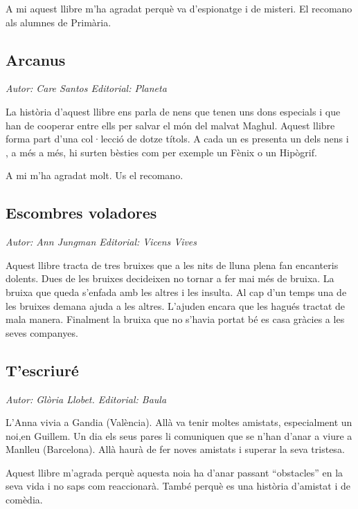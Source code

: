 \begin{news}
A mi aquest llibre m’ha agradat perquè va d’espionatge i de misteri. El recomano als alumnes de Primària.


\subsection*{Arcanus}
\emph{Autor: Care Santos   Editorial: Planeta}

La història d’aquest llibre ens parla de nens que tenen uns dons especials i que han de cooperar entre ells per salvar el món del malvat Maghul. Aquest llibre forma part d’una col·lecció de dotze títols. A cada un es presenta un dels nens i , a més a més, hi surten bèsties com per exemple un Fènix o un Hipògrif. 

A mi m’ha agradat molt. Us el recomano.


\subsection*{Escombres voladores}
\emph{Autor: Ann Jungman    Editorial: Vicens Vives}

Aquest llibre tracta de tres bruixes que a les nits de lluna plena fan encanteris dolents. Dues de les bruixes decideixen no tornar a fer mai més de bruixa. La bruixa que queda s’enfada amb les altres i les insulta. Al cap d’un temps una de les bruixes demana ajuda a les altres. L’ajuden encara que les hagués tractat de mala manera. Finalment la bruixa que no s’havia portat bé es casa gràcies a les seves companyes.


\subsection*{T’escriuré}
\emph{Autor: Glòria Llobet.   Editorial: Baula}

L’Anna vivia a Gandia (València). Allà va tenir moltes amistats, especialment  un noi,en Guillem. Un dia els seus pares li comuniquen que se n’han d’anar a viure a Manlleu (Barcelona). Allà haurà de fer noves amistats i superar la seva tristesa.

Aquest llibre m’agrada perquè aquesta noia ha d’anar passant “obstacles” en la seva vida i no saps com reaccionarà. També perquè es una història d’amistat i de comèdia.  


\end{news}
